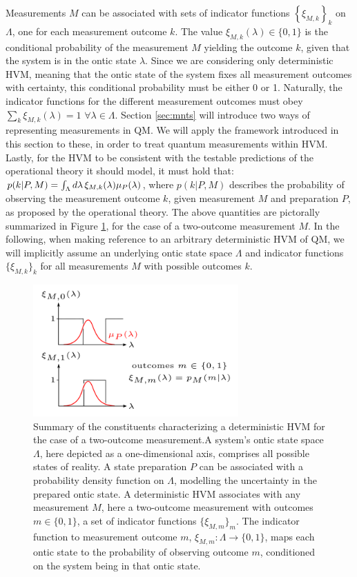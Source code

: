Measurements $M$ can be associated with sets of indicator functions $\left\{ \xi_{M,k}\right\} _{k}$ on $\Lambda$, one for each measurement outcome $k$. The value $\xi_{M,k}(\lambda)\in\{0,1\}$ is the conditional probability of the measurement $M$ yielding the outcome $k$, given that the system is in the ontic state $\lambda$. Since we are considering only deterministic HVM, meaning that the ontic state of the system fixes all measurement outcomes with certainty, this conditional probability must be either 0 or 1. Naturally, the indicator functions for the different measurement outcomes must obey $\sum_{k}\xi_{M,k}(\lambda)=1$ $\forall\lambda\in\Lambda$. Section \ref{sec:mnts} will introduce two ways of representing measurements in QM. We will apply the framework introduced in this section to these, in order to treat quantum measurements within HVM. Lastly, for the HVM to be consistent with the testable predictions of the operational theory it should model, it must hold that: $p(k\vert P,M)=\int_{\Lambda}d\lambda\thinspace\xi_{M,k}(\lambda)\mu_{P}(\lambda)$, where $p(k\vert P,M)$ describes the probability of observing the measurement outcome $k$, given measurement $M$ and preparation $P$, as proposed by the operational theory. The above quantities are pictorally summarized in Figure \ref{fig:hvm}, for the case of a two-outcome measurement $M$. In the following, when making reference to an arbitrary deterministic HVM of QM, we will implicitly assume an underlying ontic state space $\Lambda$ and indicator functions $\{\xi_{M,k}\}_{k}$ for all measurements $M$ with possible outcomes $k$.

\begin{figure}
    \centering
    \includegraphics[width=0.7\textwidth]{images/hvm.png}
    \caption{Summary of the constituents characterizing a deterministic HVM for the case of a two-outcome measurement.\hfill\break A system's ontic state space $\Lambda$, here depicted as a one-dimensional axis, comprises all possible states of reality. A state preparation $P$ can be associated with a probability density function on $\Lambda$, modelling the uncertainty in the prepared ontic state. A deterministic HVM associates with any measurement $M$, here a two-outcome measurement with outcomes $m\in\{0,1\}$, a set of indicator functions $\{\xi_{M,m}\}_m$. The indicator function to measurement outcome $m$, $\xi_{M,m}:\Lambda\rightarrow\{0,1\}$, maps each ontic state to the probability of observing outcome $m$, conditioned on the system being in that ontic state.}
    \label{fig:hvm}
\end{figure}

